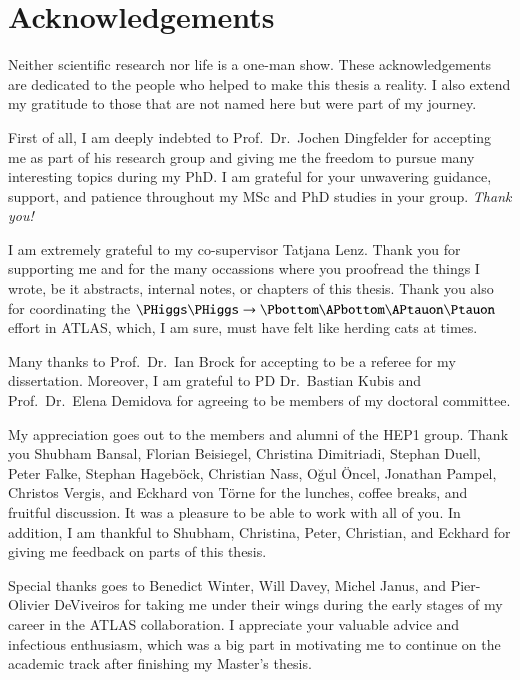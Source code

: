 \chapter*{Acknowledgements}

Neither scientific research nor life is a one-man show. These acknowledgements
are dedicated to the people who helped to make this thesis a reality. I also
extend my gratitude to those that are not named here but were part of my
journey.

First of all, I am deeply indebted to Prof.\ Dr.\ Jochen Dingfelder for
accepting me as part of his research group and giving me the freedom to pursue
many interesting topics during my PhD. I am grateful for your unwavering
guidance, support, and patience throughout my MSc and PhD studies in your
group. \emph{Thank you!}

I am extremely grateful to my co-supervisor Tatjana Lenz. Thank you for
supporting me and for the many occassions where you proofread the things I
wrote, be it abstracts, internal notes, or chapters of this thesis. Thank you
also for coordinating the $\HH \to \bbtautau$ effort in ATLAS, which, I am sure,
must have felt like herding cats at times.

Many thanks to Prof.\ Dr.\ Ian Brock for accepting to be a referee for my
dissertation. Moreover, I am grateful to PD Dr.\ Bastian Kubis and Prof.\ Dr.\
Elena Demidova for agreeing to be members of my doctoral committee.

My appreciation goes out to the members and alumni of the \textsc{HEP1}
group. Thank you Shubham Bansal, Florian Beisiegel, Christina Dimitriadi,
Stephan Duell, Peter Falke, Stephan Hageböck, Christian Nass, Oğul Öncel,
Jonathan Pampel, Christos Vergis, and Eckhard von Törne for the lunches, coffee
breaks, and fruitful discussion. It was a pleasure to be able to work with all
of you. In addition, I am thankful to Shubham, Christina, Peter, Christian, and
Eckhard for giving me feedback on parts of this thesis.

Special thanks goes to Benedict Winter, Will Davey, Michel Janus, and
Pier-Olivier DeViveiros for taking me under their wings during the early stages
of my career in the ATLAS collaboration. I appreciate your valuable advice and
infectious enthusiasm, which was a big part in motivating me to continue on the
academic track after finishing my Master's thesis.

